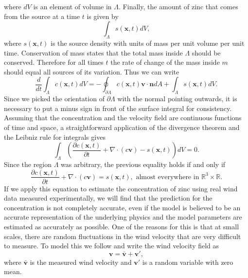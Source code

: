 \documentclass{sfuthesis}
\newcommand{\x}{\textbf{x}}
\newcommand{\vv}{\textbf{v}}
\begin{document}
\noindent where $dV$ is an element of volume in $\Lambda$. Finally, the amount of zinc that comes from the source at a time $t$ is given by
\begin{equation*}
\int_{\Lambda}s(\x,t)dV,
\end{equation*}
where $s(\x,t)$ is the source density with units of mass per unit volume per unit time.
Conservation of mass states that the total mass inside $\Lambda$ should be conserved. Therefore
for all times $t$ the rate of change of the mass inside $m$ should equal all sources of its variation. Thus
we can write
\begin{equation*}
\frac{d}{dt}\int_{\Lambda}c(\x,t)dV=-\oint_{\partial\Lambda}c(\x,t)\textbf{v}\cdot\textbf{n}dA+\int_{\Lambda}s(\x,t)dV.
\end{equation*}
Since we picked the orientation of $\partial\Lambda$ with the normal pointing outwards, it is
necessary to put a minus sign in front of the surface integral for consistency. Assuming that
the concentration and the velocity field are continuous functions of time and space, a 
straightforward application of the divergence theorem and the Leibniz rule for integrals gives
\begin{equation*}
\int_{\Lambda}\left(\frac{\partial c(\x,t)}{\partial t}+\nabla\cdot(c\textbf{v})-s(\x,t)\right)dV=0.
\end{equation*}
Since the region $\Lambda$ was arbitrary, the previous equality holds if and only if \cite{hubbard2015vector}
\begin{equation}\label{eqnDeterministic}
\frac{\partial c(\x,t)}{\partial t}+\nabla\cdot(c\textbf{v})=s(\x,t),\text{  almost everywhere in $\mathbb{R}^{3}\times\mathbb{R}$}.
\end{equation}
If we apply this equation to estimate the concentration of zinc using real wind data measured experimentally, we 
will find that the prediction for the concentration is not completely accurate, even if the model is believed to 
be an accurate representation of the underlying physics and the model parameters are estimated as accurately as possible.
One of the reasons for this is that at small scales, there
are random fluctuations in the wind velocity that are very difficult to measure. To model this we follow \cite{seinfeld1998atmospheric}
and write the wind velocity field as
\begin{equation}\label{eqnNewV}
\vv=\bar{\vv}+\vv',
\end{equation}
where $\bar{\vv}$ is the measured wind velocity and $\vv'$ is a random variable with zero mean.
\end{document}
